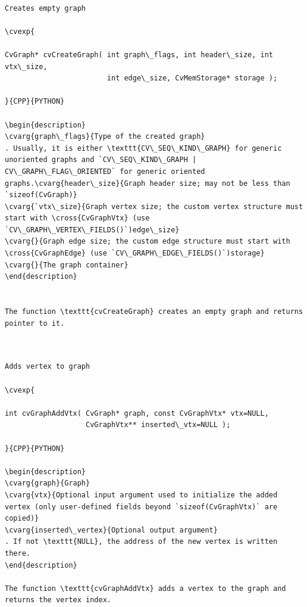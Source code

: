 \label{CreateGraph}
\begin{verbatim}

Creates empty graph

\cvexp{

CvGraph* cvCreateGraph( int graph\_flags, int header\_size, int vtx\_size,
                        int edge\_size, CvMemStorage* storage );

}{CPP}{PYTHON}

\begin{description}
\cvarg{graph\_flags}{Type of the created graph}
. Usually, it is either \texttt{CV\_SEQ\_KIND\_GRAPH} for generic unoriented graphs and `CV\_SEQ\_KIND\_GRAPH | CV\_GRAPH\_FLAG\_ORIENTED` for generic oriented graphs.\cvarg{header\_size}{Graph header size; may not be less than `sizeof(CvGraph)}
\cvarg{`vtx\_size}{Graph vertex size; the custom vertex structure must start with \cross{CvGraphVtx} (use `CV\_GRAPH\_VERTEX\_FIELDS()`)edge\_size}
\cvarg{}{Graph edge size; the custom edge structure must start with \cross{CvGraphEdge} (use `CV\_GRAPH\_EDGE\_FIELDS()`)storage}
\cvarg{}{The graph container}
\end{description}


The function \texttt{cvCreateGraph} creates an empty graph and returns pointer to it.


\end{verbatim}
\label{GraphAddVtx}
\begin{verbatim}

Adds vertex to graph

\cvexp{

int cvGraphAddVtx( CvGraph* graph, const CvGraphVtx* vtx=NULL,
                   CvGraphVtx** inserted\_vtx=NULL );

}{CPP}{PYTHON}

\begin{description}
\cvarg{graph}{Graph}
\cvarg{vtx}{Optional input argument used to initialize the added vertex (only user-defined fields beyond `sizeof(CvGraphVtx)` are copied)}
\cvarg{inserted\_vertex}{Optional output argument}
. If not \texttt{NULL}, the address of the new vertex is written there.
\end{description}

The function \texttt{cvGraphAddVtx} adds a vertex to the graph and returns the vertex index.


\end{verbatim}
\label{GraphRemoveVtx}
